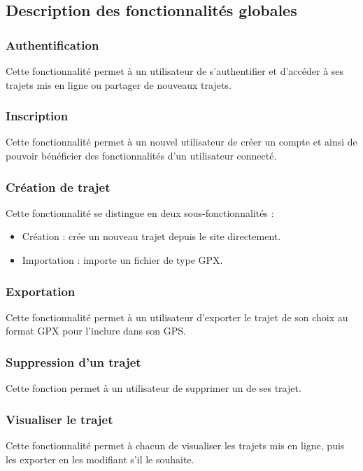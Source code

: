 \documentclass[a4paper]{article}
\begin{document}
\subsection{Description des fonctionnalités globales}
\subsubsection{Authentification}
Cette fonctionnalité permet à un utilisateur de s'authentifier et d'accéder à ses trajets mis en ligne ou partager de nouveaux trajets.

\subsubsection{Inscription}
Cette fonctionnalité permet à un nouvel utilisateur de créer un compte et ainsi de pouvoir bénéficier des fonctionnalités d'un utilisateur connecté.

\subsubsection{Création de trajet}
Cette fonctionnalité se distingue en deux sous-fonctionnalités : 
\begin{itemize}
    \item Création : crée un nouveau trajet depuis le site directement.
    \item Importation : importe un fichier de type GPX.
\end{itemize}

\subsubsection{Exportation}
Cette fonctionnalité permet à un utilisateur d'exporter le trajet de son choix au format GPX pour l'inclure dans son GPS.

\subsubsection{Suppression d'un trajet}
Cette fonction permet à un utilisateur de supprimer un de ses trajet.

\subsubsection{Visualiser le trajet}
Cette fonctionnalité permet à chacun de visualiser les trajets mis en ligne, puis les exporter en les modifiant s'il le souhaite.
\end{document}
